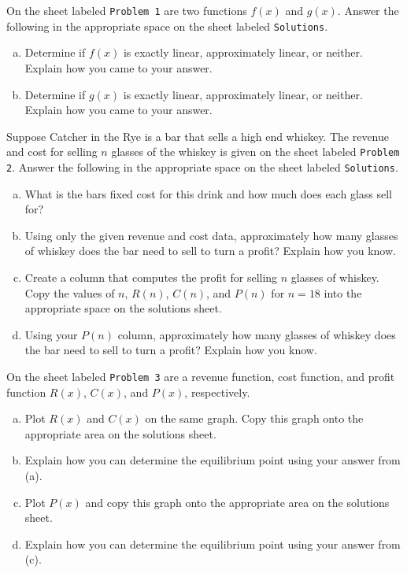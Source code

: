 \documentclass[11pt,letterpaper]{article}
\begin{document}

 On the sheet labeled \texttt{Problem 1} are two functions $f(x)$ and $g(x)$. Answer the following in the appropriate space on the sheet labeled \texttt{Solutions}. 
	\begin{enumerate}[(a)]
	\item Determine if $f(x)$ is exactly linear, approximately linear, or neither. Explain how you came to your answer. 
	\item Determine if $g(x)$ is exactly linear, approximately linear, or neither. Explain how you came to your answer. 
	\end{enumerate} \pspace



 Suppose Catcher in the Rye is a bar that sells a high end whiskey. The revenue and cost for selling $n$ glasses of the whiskey is given on the sheet labeled \texttt{Problem 2}. Answer the following in the appropriate space on the sheet labeled \texttt{Solutions}. 
	\begin{enumerate}[(a)]
	\item What is the bars fixed cost for this drink and how much does each glass sell for?
	\item Using only the given revenue and cost data, approximately how many glasses of whiskey does the bar need to sell to turn a profit? Explain how you know. 
	\item Create a column that computes the profit for selling $n$ glasses of whiskey. Copy the values of $n$, $R(n)$, $C(n)$, and $P(n)$ for $n= 18$ into the appropriate space on the solutions sheet. 
	\item Using your $P(n)$ column, approximately how many glasses of whiskey does the bar need to sell to turn a profit? Explain how you know. 
	\end{enumerate} \pspace



 On the sheet labeled \texttt{Problem 3} are a revenue function, cost function, and profit function $R(x)$, $C(x)$, and $P(x)$, respectively. 
	\begin{enumerate}[(a)]
	\item Plot $R(x)$ and $C(x)$ on the same graph. Copy this graph onto the appropriate area on the solutions sheet. 
	\item Explain how you can determine the equilibrium point using your answer from (a). 
	\item Plot $P(x)$ and copy this graph onto the appropriate area on the solutions sheet. 
	\item Explain how you can determine the equilibrium point using your answer from (c). 
	\end{enumerate} \pspace
\end{document}
